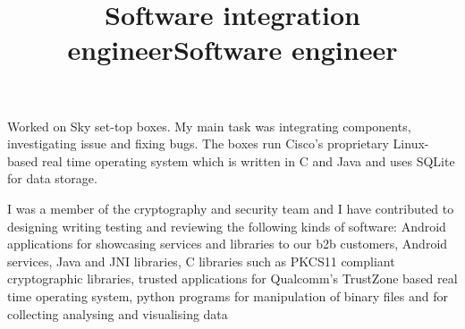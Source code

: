 \begin{resume}
        \title{Software integration engineer}
        \begin{position}
            Worked on Sky set-top boxes.
            My main task was integrating components, investigating issue and fixing bugs.
            The boxes run Cisco's proprietary Linux-based real time operating system which is written in C and Java
            and uses SQLite for data storage.
        \end{position}

        \title{Software engineer}
        \begin{position}
            I was a member of the cryptography and security team and I have contributed to designing writing testing and reviewing the following kinds of software:
            Android applications for showcasing services and libraries to our b2b customers,
            Android services,
            Java and JNI libraries,
            C libraries such as PKCS11 compliant cryptographic libraries,
            trusted applications for Qualcomm's TrustZone based real time operating system,
            python programs for manipulation of binary files and for collecting analysing and visualising data


        \end{position}


\end{resume}
